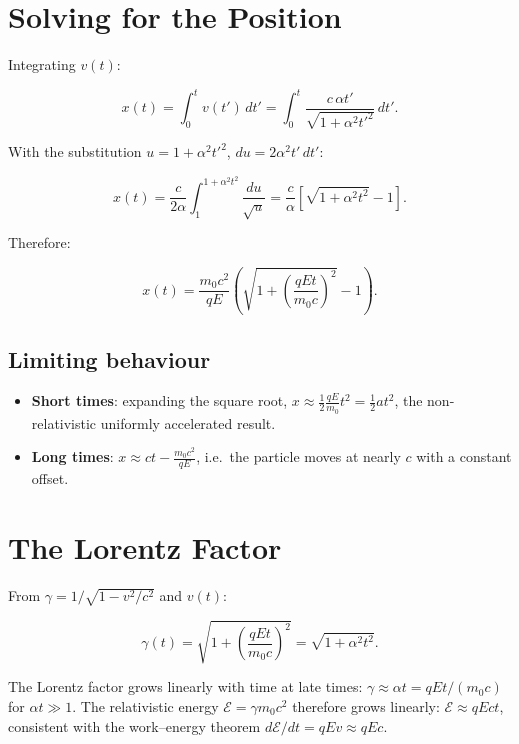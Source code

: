 \section{Solving for the Position}

Integrating $v(t)$:

\begin{equation}
x(t) = \int_0^t v(t')\,dt' = \int_0^t \frac{c\,\alpha t'}{\sqrt{1 + \alpha^2 t'^2}}\,dt'.
\end{equation}

With the substitution $u = 1 + \alpha^2 t'^2$, $du = 2\alpha^2 t'\,dt'$:

\begin{equation}
x(t) = \frac{c}{2\alpha}\int_1^{1+\alpha^2 t^2} \frac{du}{\sqrt{u}} = \frac{c}{\alpha}\!\left[\sqrt{1 + \alpha^2 t^2} - 1\right].
\end{equation}

Therefore:

\begin{equation}
\boxed{x(t) = \frac{m_0 c^2}{qE}\!\left(\sqrt{1 + \left(\frac{qEt}{m_0 c}\right)^2} - 1\right).}
\end{equation}

\subsection{Limiting behaviour}

\begin{itemize}
\item \textbf{Short times}: expanding the square root, $x \approx \frac{1}{2}\frac{qE}{m_0}t^2 = \frac{1}{2}at^2$, the non-relativistic uniformly accelerated result.
\item \textbf{Long times}: $x \approx ct - \frac{m_0 c^2}{qE}$, i.e.\ the particle moves at nearly $c$ with a constant offset.
\end{itemize}

\section{The Lorentz Factor}

From $\gamma = 1/\sqrt{1-v^2/c^2}$ and $v(t)$:

\begin{equation}
\boxed{\gamma(t) = \sqrt{1 + \left(\frac{qEt}{m_0 c}\right)^2} = \sqrt{1 + \alpha^2 t^2}.}
\end{equation}

The Lorentz factor grows linearly with time at late times: $\gamma \approx \alpha t = qEt/(m_0 c)$ for $\alpha t \gg 1$. The relativistic energy $\mathcal{E} = \gamma m_0 c^2$ therefore grows linearly: $\mathcal{E} \approx qEct$, consistent with the work--energy theorem $d\mathcal{E}/dt = qEv \approx qEc$.

